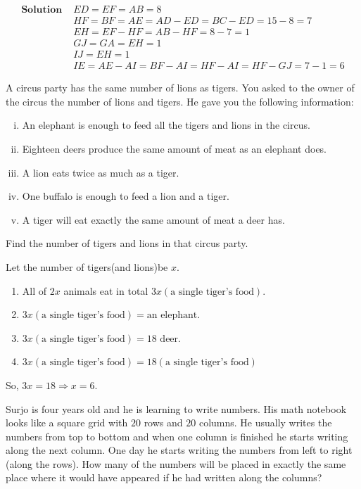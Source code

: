 \documentclass{subfile}
\begin{document}
	\begin{solution}
		\begin{align*}
		\textbf{Solution }&ED=EF=AB=8\\
		&HF=BF=AE=AD-ED=BC-ED=15-8=7\\
		&EH=EF-HF=AB-HF=8-7=1\\
		&GJ=GA=EH=1\\
		&IJ=EH=1\\
		&IE=AE-AI=BF-AI=HF-AI=HF-GJ=7-1=6
		\end{align*}

	\end{solution}

	\begin{problem} A circus party has the same number of lions as tigers. You asked to the owner of the circus the number
		of lions and tigers. He gave you the following information:
			\begin{enumerate}[i.]
				\item An elephant is enough to feed all the tigers and lions in the circus.
				\item Eighteen deers produce the same amount of meat as an elephant does.
				\item A lion eats twice as much as a tiger.
				\item One buffalo is enough to feed a lion and a tiger.
				\item A tiger will eat exactly the same amount of meat a deer has.
			\end{enumerate}
		Find the number of tigers and lions in that circus party.

	\end{problem}

	\begin{solution} Let the number of tigers(and lions)be $x$.
		\begin{enumerate}
			\item All of $2x$ animals eat in total $3x(\text{a single tiger's food})$.
			\item $3x(\text{a single tiger's food})=\text{an elephant}$.
			\item $ 3x(\text{a single tiger's food})=18 \text{ deer}$.
			\item $ 3x(\text{a single tiger's food})=18(\text{a single tiger's food})$
		\end{enumerate}
		So, $3x=18 \Rightarrow x=6$.
	\end{solution}


	\begin{problem} Surjo is four years old and he is learning to write numbers. His math notebook looks like a square grid with $20$ rows and $20$ columns. He usually writes the numbers from top to bottom and when one column is finished he starts writing along the next column. One day he starts writing the numbers from left to	right (along the rows). How many of the numbers will be placed in exactly the same place where it would have appeared if he had written along the columns?

	\end{problem}
\end{document}
